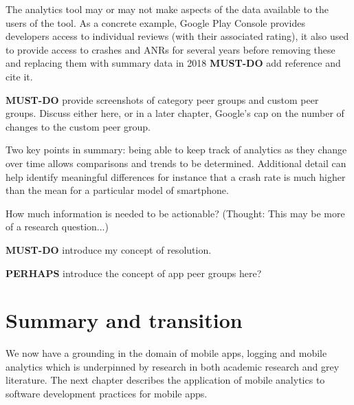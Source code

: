 The analytics tool may or may not make aspects of the data available to the users of the tool. As a concrete example, Google Play Console provides developers access to individual reviews (with their associated rating), it also used to provide access to crashes and ANRs for several years before removing these and replacing them with summary data in 2018 \textbf{MUST-DO} add reference and cite it.

\textbf{MUST-DO} provide screenshots of category peer groups and custom peer groups. Discuss either here, or in a later chapter, Google's cap on the number of changes to the custom peer group.

Two key points in summary: being able to keep track of analytics as they change over time allows comparisons and trends to be determined. Additional detail can help identify meaningful differences for instance that a crash rate is much higher than the mean for a particular model of smartphone. 

How much information is needed to be actionable? (Thought: This may be more of a research question...)


\textbf{MUST-DO} introduce my concept of resolution.

\textbf{PERHAPS} introduce the concept of app peer groups here?


\section{Summary and transition}
We now have a grounding in the domain of mobile apps, logging and mobile analytics which is underpinned by research in both academic research and grey literature. The next chapter describes the application of mobile analytics to software development practices for mobile apps.
